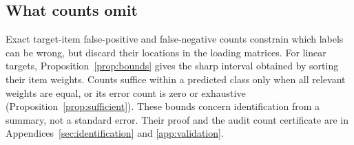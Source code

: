 \subsection{What counts omit}
Exact target-item false-positive and false-negative counts constrain which
labels can be wrong, but discard their locations in the loading matrices.
For linear targets, Proposition~\ref{prop:bounds} gives the sharp interval
obtained by sorting their item weights. Counts suffice within a predicted
class only when all relevant weights are equal, or its error count is zero
or exhaustive (Proposition~\ref{prop:sufficient}). These bounds concern
identification from a summary, not a standard error. Their proof and the
audit count certificate are in Appendices~\ref{sec:identification} and
\ref{app:validation}.
